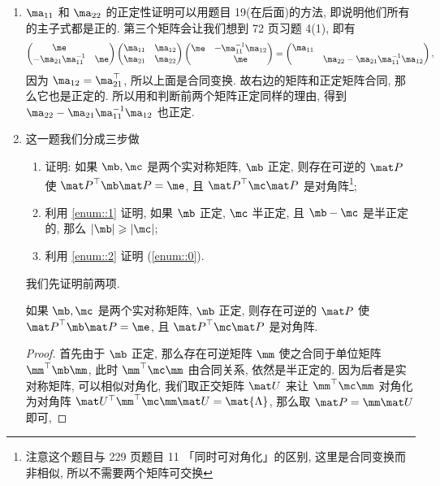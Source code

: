 \begin{solution}
\begin{enumerate}
    \item $\ma_{11}$ 和 $\ma_{22}$ 的正定性证明可以用题目 19(在后面)的方法, 即说明他们所有的主子式都是正的. 第三个矩阵会让我们想到 72 页习题 4(1), 即有
    \[
    \begin{pmatrix}
        \me &  \\
        -\ma_{21}\ma_{11}^{-1} & \me
    \end{pmatrix}
    \begin{pmatrix}
        \ma_{11} & \ma_{12} \\
        \ma_{21} & \ma_{22}
    \end{pmatrix}
    \begin{pmatrix}
        \me & -\ma_{11}^{-1} \ma_{12} \\
         & \me
    \end{pmatrix} = 
    \begin{pmatrix}
        \ma_{11} & \\
        & \ma_{22} - \ma_{21}\ma_{11}^{-1}\ma_{12}
    \end{pmatrix},
    \]
    因为 $\ma_{12} = \ma_{21}^\top$, 所以上面是合同变换. 故右边的矩阵和正定矩阵合同, 那么它也是正定的. 所以用和判断前两个矩阵正定同样的理由, 得到 $\ma_{22} - \ma_{21}\ma_{11}^{-1}\ma_{12}$ 也正定.
    \item 这一题我们分成三步做
    \begin{enumerate}[label=\alph*)]
        \item\label{enum::1} 证明: 如果 $\mb, \mc$ 是两个实对称矩阵, $\mb$ 正定, 则存在可逆的 $\mpp$ 使 $\quadform{\mpp}{\mb}= \me$, 且 $\quadform{\mpp}{\mc}$ 是对角阵\footnote{注意这个题目与 229 页题目 11 「同时可对角化」的区别, 这里是合同变换而非相似, 所以不需要两个矩阵可交换};
        \item\label{enum::2} 利用 \ref{enum::1} 证明, 如果 $\mb$ 正定, $\mc$ 半正定, 且 $\mb - \mc$ 是半正定的, 那么 $|\mb| \geqslant |\mc|$;
        \item 利用 \ref{enum::2} 证明 (\ref{enum::0}).
    \end{enumerate}
    我们先证明前两项.
    \begin{lemma}\label{lemma::1}
        如果 $\mb, \mc$ 是两个实对称矩阵, $\mb$ 正定, 则存在可逆的 $\mpp$ 使 $\quadform{\mpp}{\mb}= \me$, 且 $\quadform{\mpp}{\mc}$ 是对角阵.
    \end{lemma}
    \begin{proof}
        首先由于 $\mb$ 正定, 那么存在可逆矩阵 $\mm$ 使之合同于单位矩阵 $\quadform{\mm}{\mb}$, 此时 $\quadform{\mm}{\mc}$ 由合同关系, 依然是半正定的. 因为后者是实对称矩阵, 可以相似对角化, 我们取正交矩阵 $\muu$ 来让 $\quadform{\mm}{\mc}$ 对角化为对角阵 $\muu^\top \quadform{\mm}{\mc} \muu = \mat{\Lambda}$, 那么取 $\mpp = \mm \muu$ 即可,

\end{proof}
\end{enumerate}
\end{solution}
